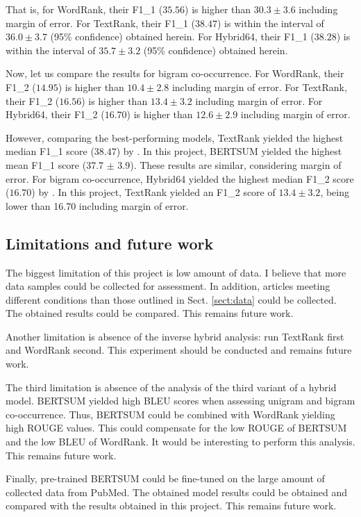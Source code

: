 \documentclass[11pt]{article}
\begin{document}
That is, for WordRank, their F1\_1 ($35.56$) is higher than $30.3 \pm 3.6$ including margin of error. For TextRank, their F1\_1 ($38.47$) is within the interval of $36.0 \pm 3.7$ (95\% confidence) obtained herein. For Hybrid64, their F1\_1 ($38.28$) is within the interval of $35.7 \pm 3.2$ (95\% confidence) obtained herein. 

Now, let us compare the results for bigram co-occurrence. For WordRank, their F1\_2 ($14.95$) is higher than $10.4 \pm 2.8$ including margin of error. For TextRank, their F1\_2 ($16.56$) is higher than $13.4 \pm 3.2$ including margin of error. For Hybrid64, their F1\_2 ($16.70$) is higher than $12.6 \pm 2.9$ including margin of error. 

However, comparing the best-performing models, TextRank yielded the highest median F1\_1 score ($38.47$) by \citet{reza2020}. In this project, BERTSUM yielded the highest mean F1\_1 score (37.7 $\pm$ 3.9). These results are similar, considering margin of error. For bigram co-occurrence, Hybrid64 yielded the highest median F1\_2 score ($16.70$) by \citet{reza2020}. In this project, TextRank yielded an F1\_2 score of $13.4 \pm 3.2$, being lower than 16.70 including margin of error.


\subsection{Limitations and future work}

The biggest limitation of this project is low amount of data. I believe that more data samples could be collected for assessment. In addition, articles meeting different conditions than those outlined in Sect. \ref{sect:data} could be collected. The obtained results could be compared. This remains future work.

Another limitation is absence of the inverse hybrid analysis: run TextRank first and WordRank second. This experiment should be conducted and remains future work.

The third limitation is absence of the analysis of the third variant of a hybrid model. BERTSUM yielded high BLEU scores when assessing unigram and bigram co-occurrence. Thus, BERTSUM could be combined with WordRank yielding high ROUGE values. This could compensate for the low ROUGE of BERTSUM and the low BLEU of WordRank. It would be interesting to perform this analysis. This remains future work.

Finally, pre-trained BERTSUM could be fine-tuned on the large amount of collected data from PubMed. The obtained model results could be obtained and compared with the results obtained in this project. This remains future work.
\end{document}
